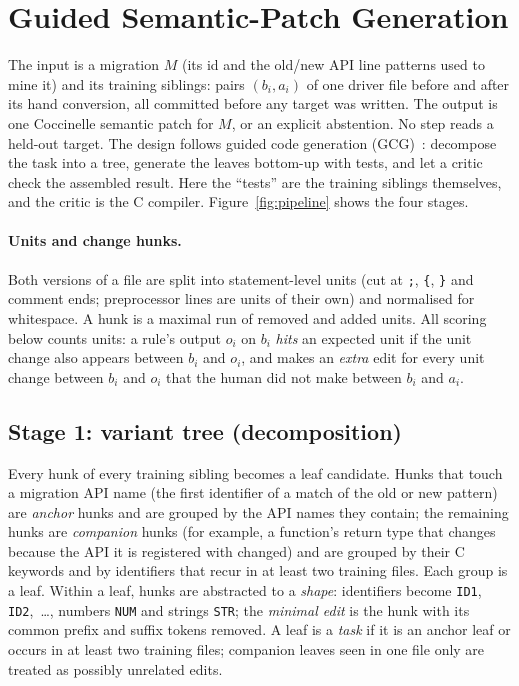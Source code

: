 \section{Guided Semantic-Patch Generation}
\label{sec:method}

The input is a migration $M$ (its id and the old/new API line patterns used to mine it) and its training siblings:
pairs $(b_i, a_i)$ of one driver file before and after its hand conversion, all committed before any target was
written. The output is one Coccinelle semantic patch for $M$, or an explicit abstention. No step reads a held-out
target. The design follows guided code generation (GCG)~\cite{almorsi2025gcg}: decompose the task into a tree,
generate the leaves bottom-up with tests, and let a critic check the assembled result. Here the ``tests'' are the
training siblings themselves, and the critic is the C compiler. Figure~\ref{fig:pipeline} shows the four stages.



\paragraph{Units and change hunks.} Both versions of a file are split into statement-level units (cut at
\texttt{;}, \texttt{\{}, \texttt{\}} and comment ends; preprocessor lines are units of their own) and normalised for
whitespace. A hunk is a maximal run of removed and added units. All scoring below counts units: a rule's output
$o_i$ on $b_i$ \emph{hits} an expected unit if the unit change also appears between $b_i$ and $o_i$, and makes an
\emph{extra} edit for every unit change between $b_i$ and $o_i$ that the human did not make between $b_i$ and $a_i$.

\subsection{Stage 1: variant tree (decomposition)}
Every hunk of every training sibling becomes a leaf candidate. Hunks that touch a migration API name (the first
identifier of a match of the old or new pattern) are \emph{anchor} hunks and are grouped by the API names they
contain; the remaining hunks are \emph{companion} hunks (for example, a function's return type that changes because
the API it is registered with changed) and are grouped by their C keywords and by identifiers that recur in at least
two training files. Each group is a leaf. Within a leaf, hunks are abstracted to a \emph{shape}: identifiers become
\texttt{ID1}, \texttt{ID2},~\ldots, numbers \texttt{NUM} and strings \texttt{STR}; the \emph{minimal edit} is the
hunk with its common prefix and suffix tokens removed. A leaf is a \emph{task} if it is an anchor leaf or occurs in
at least two training files; companion leaves seen in one file only are treated as possibly unrelated edits.

